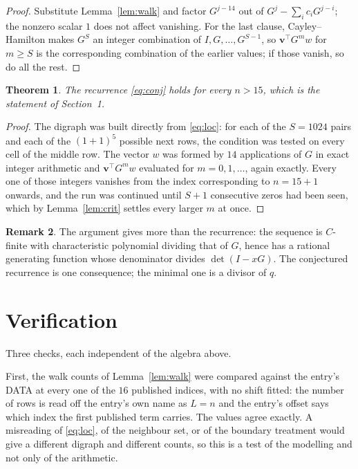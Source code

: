 \documentclass[11pt,a4paper]{article}
\theoremstyle{plain}
\newtheorem{theorem}{Theorem}
\theoremstyle{definition}
\newtheorem{remark}[theorem]{Remark}
\begin{document}
\begin{proof}
Substitute Lemma~\ref{lem:walk} and factor $G^{j-14}$ out of
$G^{j}-\sum_ic_iG^{j-i}$; the nonzero scalar $1$ does not affect
vanishing. For the last clause, Cayley--Hamilton makes $G^{S}$ an integer combination of
$I,G,\dots,G^{S-1}$, so $\mathbf{v}^{\!\top}G^{m}w$ for $m\ge S$ is the corresponding
combination of the earlier values; if those vanish, so do all the rest.
\end{proof}

\begin{theorem}
The recurrence \eqref{eq:conj} holds for every $n>15$, which is the statement of
Section~1.
\end{theorem}

\begin{proof}
The digraph was built directly from \eqref{eq:loc}: for each of the $S=1024$ pairs and each
of the $(1+1)^{5}$ possible next rows, the condition was tested on every cell of
the middle row. The vector $w$ was formed by $14$ applications of $G$ in exact integer
arithmetic and $\mathbf{v}^{\!\top}G^{m}w$ evaluated for $m=0,1,\dots$, again exactly.
Every one of those integers vanishes from the index corresponding to $n=15+1$ onwards,
and the run was continued until $S+1$ consecutive zeros had been seen, which by
Lemma~\ref{lem:crit} settles every larger $m$ at once.
\end{proof}

\begin{remark}
The argument gives more than the recurrence: the sequence is $C$-finite with characteristic
polynomial dividing that of $G$, hence has a rational generating function whose denominator
divides $\det(I-xG)$. The conjectured recurrence is one consequence; the minimal one is a
divisor of $q$.
\end{remark}

\section{Verification}

Three checks, each independent of the algebra above.

First, the walk counts of Lemma~\ref{lem:walk} were compared against the entry's DATA at
every one of the $16$ published indices, with no shift fitted: the number of rows is
read off the entry's own name as $L=n$ and the entry's offset says which index the first
published term carries. The values agree exactly. A misreading of \eqref{eq:loc}, of the
neighbour set, or of the boundary treatment would give a different digraph and different
counts, so this is a test of the modelling and not only of the arithmetic.
\end{document}

